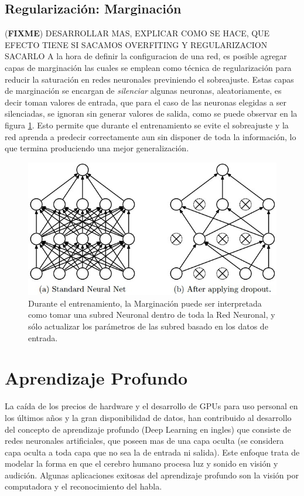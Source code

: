 \documentclass[a4paper,11pt,spanish]{book}
\newcommand*{\FIXME}[1]{{(\textbf{FIXME}) {#1}}}
\begin{document}
      \subsection {Regularización: Marginación}
	\FIXME{DESARROLLAR MAS, EXPLICAR COMO SE HACE, QUE EFECTO TIENE SI SACAMOS OVERFITING Y REGULARIZACION SACARLO}
	A la hora de definir la configuracion de una red, es posible agregar capas de marginación las cuales se emplean como
	técnica de regularización para reducir la saturación en redes neuronales previniendo el sobreajuste. Estas capas de marginación se encargan de
	\emph{silenciar} algunas neuronas, aleatoriamente, es decir toman valores de entrada, que para el caso de las neuronas elegidas a ser silenciadas, se ignoran
	sin generar valores de salida, como se puede observar en la figura \ref{fig:dropout}. Esto permite que durante el entrenamiento se evite el sobreajuste y la red aprenda
	a predecir correctamente aun sin disponer de toda la información, lo que termina produciendo una mejor generalización.
	\begin{figure}[ht]
	  \begin{center}
	   \includegraphics[width=0.6\linewidth]{./img/dropout.jpeg}
	  \end{center}
	  \caption{Durante el entrenamiento, la Marginación puede ser interpretada como tomar una subred Neuronal dentro de toda la Red Neuronal, y sólo actualizar los parámetros
	  de las subred basado en los datos de entrada. \cite{Srivastava:Dropout} }
	  \label{fig:dropout}
	\end{figure}
\iffalse
  \section {Aprendizaje Profundo}
    La caída de los precios de hardware y el desarrollo de GPUs para uso personal en los últimos años y la gran disponibilidad de datos, han contribuido al desarrollo del
    concepto de aprendizaje profundo (Deep Learning en ingles)
    que consiste de redes neuronales artificiales, que poseen mas de una capa oculta (se considera capa oculta a toda capa que no sea la de entrada ni salida). Este enfoque trata de
    modelar la forma en que el cerebro humano procesa luz y sonido en visión y audición.
    Algunas aplicaciones exitosas del aprendizaje profundo son la visión por computadora y el reconocimiento del habla.
\end{document}
